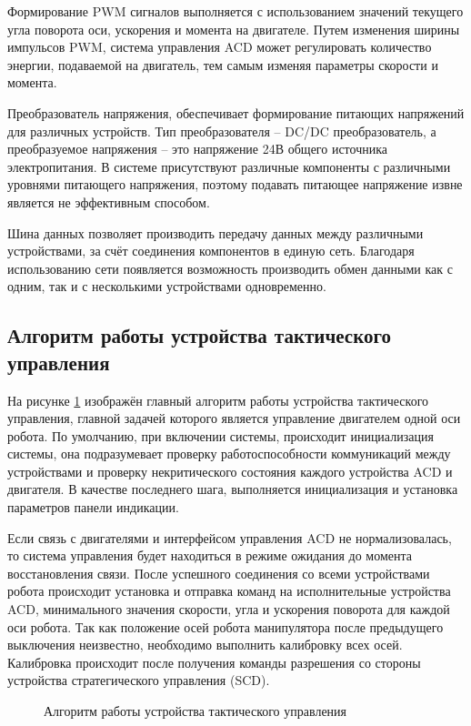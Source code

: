 Формирование PWM сигналов выполняется с использованием значений текущего угла поворота оси, ускорения и момента на двигателе. Путем изменения ширины импульсов PWM, система управления ACD может регулировать количество энергии, подаваемой на двигатель, тем самым изменяя параметры скорости и момента.

Преобразователь напряжения, обеспечивает формирование питающих напряжений для различных устройств. Тип преобразователя – DC/DC преобразователь, а преобразуемое напряжения – это напряжение 24В общего источника электропитания. В системе присутствуют различные компоненты с различными уровнями питающего напряжения, поэтому подавать питающее напряжение извне является не эффективным способом.

Шина данных позволяет производить передачу данных между различными устройствами, за счёт соединения компонентов в единую сеть. Благодаря использованию сети появляется возможность производить обмен данными как с одним, так и с несколькими устройствами одновременно. 

\subsection{Алгоритм работы устройства тактического управления}
На рисунке \ref{AlgTCD} изображён главный алгоритм работы устройства тактического управления, главной задачей которого является управление двигателем одной оси робота. По умолчанию, при включении системы, происходит инициализация системы, она подразумевает проверку работоспособности коммуникаций между устройствами и проверку некритического состояния каждого устройства ACD и двигателя. В качестве последнего шага, выполняется инициализация и установка параметров панели индикации.

Если связь с двигателями и интерфейсом управления ACD не нормализовалась, то система управления будет находиться в режиме ожидания до момента восстановления связи. После успешного соединения со всеми устройствами робота происходит установка и отправка команд на исполнительные устройства ACD, минимального значения скорости, угла и ускорения поворота для каждой оси робота. Так как положение осей робота манипулятора после предыдущего выключения неизвестно, необходимо выполнить калибровку всех осей. Калибровка происходит после получения команды разрешения со стороны устройства стратегического управления (SCD).

\begin{figure}[H]
	\centering
	
	\caption{Алгоритм работы устройства тактического управления}
	\label{AlgTCD}
\end{figure}

